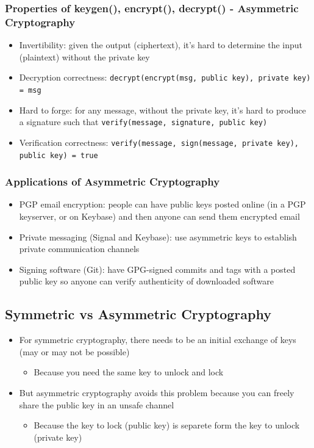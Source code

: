\documentclass[letterpaper,12pt]{article}
\begin{document}
\subsubsection{Properties of keygen(), encrypt(), decrypt() - Asymmetric Cryptography}
\begin{itemize}
 \item Invertibility: given the output (ciphertext), it's hard to determine the input (plaintext) without the private key
 \item Decryption correctness: \lstinline{decrypt(encrypt(msg, public key), private key) = msg}
 \item Hard to forge: for any message, without the private key, it's hard to produce a signature such that \lstinline{verify(message, signature, public key)}
 \item Verification correctness: \lstinline{verify(message, sign(message, private key), public key) = true}
\end{itemize}


\subsubsection{Applications of Asymmetric Cryptography}
\begin{itemize}
 \item PGP email encryption: people can have public keys posted online (in a PGP keyserver, or on Keybase) and then anyone can send them encrypted email
 \item Private messaging (Signal and Keybase): use asymmetric keys to establish private communication channels
 \item Signing software (Git): have GPG-signed commits and tags with a posted public key so anyone can verify authenticity of downloaded software
\end{itemize}

\subsection{Symmetric vs Asymmetric Cryptography}
\begin{itemize}
 \item For symmetric cryptography, there needs to be an initial exchange of keys (may or may not be possible)
       \begin{itemize}
        \item Because you need the same key to unlock and lock
       \end{itemize}
 \item But asymmetric cryptography avoids this problem because you can freely share the public key in an unsafe channel
       \begin{itemize}
        \item Because the key to lock (public key) is separete form the key to unlock (private key)
       \end{itemize}
\end{itemize}
\end{document}
